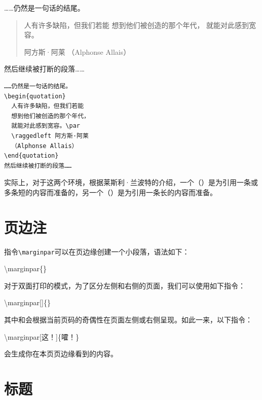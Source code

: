 \begin{codelist}[2.16]{
  ……仍然是一句话的结尾。
\begin{quotation}
  人有许多缺陷，但我们若能
  想到他们被创造的那个年代，
  就能对此感到宽容。\par
  \raggedleft 阿方斯·阿莱
  （Alphonse Allais）
\end{quotation}
然后继续被打断的段落……
}
\begin{verbatim}
……仍然是一句话的结尾。
\begin{quotation}
  人有许多缺陷，但我们若能
  想到他们被创造的那个年代，
  就能对此感到宽容。\par
  \raggedleft 阿方斯·阿莱
  （Alphonse Allais）
\end{quotation}
然后继续被打断的段落……\end{verbatim}
\end{codelist}

实际上，对于这两个环境，根据莱斯利·兰波特的介绍，一个（）是为引用一条或多条短的内容而准备的，另一个（）是为引用一条长的内容而准备。

\section{页边注}

指令\verb|\marginpar|可以在页边缘创建一个小段落，语法如下：

\begin{dmd}
\backslash marginpar\{\}
\end{dmd}

对于双面打印的模式，为了区分左侧和右侧的页面，我们可以使用如下指令：

\begin{dmd}
\backslash marginpar[]\{\}
\end{dmd}

其中和会根据当前页码的奇偶性在页面左侧或右侧呈现。如此一来，以下指令：

\begin{dmd}
\backslash marginpar[这！]\{嚯！\}
\end{dmd}

会生成你在本页页边缘看到的内容。

\section{标题}

